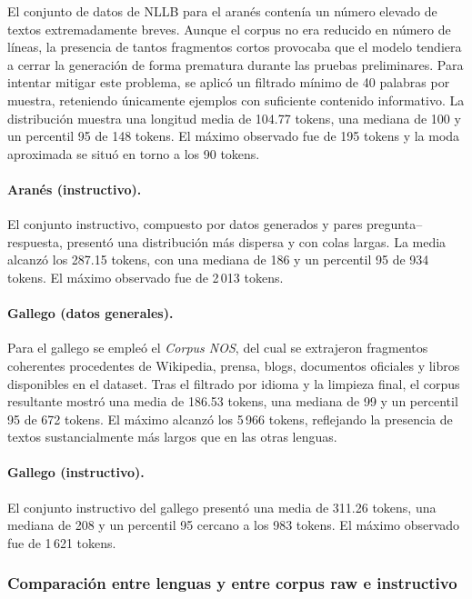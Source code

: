 El conjunto de datos de NLLB para el aranés contenía un número elevado de textos extremadamente breves. Aunque el corpus no era reducido en número de líneas, la presencia de tantos fragmentos cortos provocaba que el modelo tendiera a cerrar la generación de forma prematura durante las pruebas preliminares. Para intentar mitigar este problema, se aplicó un filtrado mínimo de 40 palabras por muestra, reteniendo únicamente ejemplos con suficiente contenido informativo. La distribución muestra una longitud media de 104.77 tokens, una mediana de 100 y un percentil 95 de 148 tokens. El máximo observado fue de 195 tokens y la moda aproximada se situó en torno a los 90 tokens.

\paragraph{Aranés (instructivo).}

El conjunto instructivo, compuesto por datos generados y pares pregunta–respuesta, presentó una distribución más dispersa y con colas largas. La media alcanzó los 287.15 tokens, con una mediana de 186 y un percentil 95 de 934 tokens. El máximo observado fue de 2\,013 tokens.

\paragraph{Gallego (datos generales).}

Para el gallego se empleó el \textit{Corpus NOS}, del cual se extrajeron fragmentos coherentes procedentes de Wikipedia, prensa, blogs, documentos oficiales y libros disponibles en el dataset. Tras el filtrado por idioma y la limpieza final, el corpus resultante mostró una media de 186.53 tokens, una mediana de 99 y un percentil 95 de 672 tokens. El máximo alcanzó los 5\,966 tokens, reflejando la presencia de textos sustancialmente más largos que en las otras lenguas.

\paragraph{Gallego (instructivo).}

El conjunto instructivo del gallego presentó una media de 311.26 tokens, una mediana de 208 y un percentil 95 cercano a los 983 tokens. El máximo observado fue de 1\,621 tokens.

\subsubsection*{Comparación entre lenguas y entre corpus raw e instructivo}

